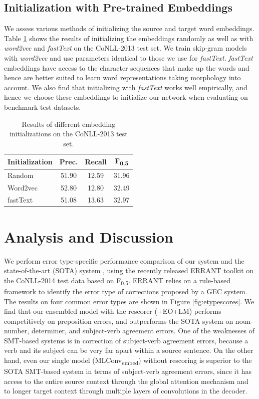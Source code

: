 \documentclass[letterpaper]{article} %
\begin{document}
\subsection{Initialization with Pre-trained Embeddings}

We assess various methods of initializing the source and target word embeddings. Table \ref{tbl:embeddings} shows the results of initializing the embeddings randomly as well as with \textit{word2vec} and \textit{fastText} on the CoNLL-2013 test set. We train skip-gram models with \textit{word2vec} and use parameters identical to those we use for \textit{fastText}.   \textit{fastText} embeddings have access to the character sequences that make up the words and hence are better suited to learn word representations taking morphology into account. We also find that initializing with \textit{fastText} works well empirically, and hence we choose these embeddings to initialize our network when evaluating on benchmark test datasets. 

\begin{table}[t]
\centering
\small
\begin{tabular}{|l|c|c|c|}
 \hline
Initialization  &	 Prec. & 	Recall & 	F\textsubscript{0.5} 	\\
\hline 
Random 			&	51.90	&	12.59	& 31.96		\\ 
Word2vec 		&	52.80	&	12.80	& 32.49	\\ 
\hline
fastText 		&	51.08   &   13.63   & 32.97   	\\ 
\hline
\end{tabular}
\caption{Results of different embedding initializations on the CoNLL-2013 test set.}
\label{tbl:embeddings}
\end{table}

\section{Analysis and Discussion}

We perform error type-specific performance comparison of our system and the state-of-the-art (SOTA) system \cite{chollampatt2017connectingdots}, using the recently released ERRANT toolkit \cite{bryant2017automatic} on the CoNLL-2014 test data based on F\textsubscript{0.5}. ERRANT relies on a rule-based framework to identify the error type of corrections proposed by a GEC system. The results on four common error types are shown in Figure \ref{fig:etypescores}. We find that our ensembled model with the rescorer (+EO+LM) performs competitively on preposition errors, and outperforms the SOTA system on noun-number, determiner, and subject-verb agreement errors. One of the weaknesses of SMT-based systems is in correction of subject-verb agreement errors, because a verb and its subject can be very far apart within a source sentence. On the other hand, even our single model (MLConv\textsubscript{embed}) without rescoring is superior to the SOTA SMT-based system in terms of subject-verb agreement errors, since it has access to the entire source context through the global attention mechanism and to longer target context through multiple layers of convolutions in the decoder. 
\end{document}
